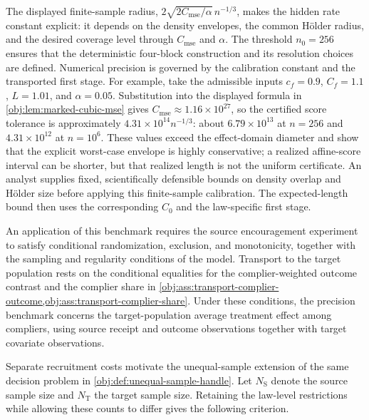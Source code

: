 \documentclass[11pt]{article}
\begin{document}
The displayed finite-sample radius, \(2\sqrt{2C_{\mathrm{mse}}/\alpha}\,n^{-1/3}\), makes the hidden rate constant explicit: it depends on the density envelopes, the common H\"older radius, and the desired coverage level through \(C_{\mathrm{mse}}\) and \(\alpha\). The threshold \(n_0=256\) ensures that the deterministic four-block construction and its resolution choices are defined. Numerical precision is governed by the calibration constant and the transported first stage. For example, take the admissible inputs \(c_f=0.9\), \(C_f=1.1\), \(L=1.01\), and \(\alpha=0.05\). Substitution into the displayed formula in \cref{obj:lem:marked-cubic-mse} gives \(C_{\mathrm{mse}}\approx1.16\times10^{27}\), so the certified score tolerance is approximately \(4.31\times10^{14}n^{-1/3}\): about \(6.79\times10^{13}\) at \(n=256\) and \(4.31\times10^{12}\) at \(n=10^6\). These values exceed the effect-domain diameter and show that the explicit worst-case envelope is highly conservative; a realized affine-score interval can be shorter, but that realized length is not the uniform certificate. An analyst supplies fixed, scientifically defensible bounds on density overlap and Hölder size before applying this finite-sample calibration. The expected-length bound then uses the corresponding \(C_0\) and the law-specific first stage.

An application of this benchmark requires the source encouragement experiment to satisfy conditional randomization, exclusion, and monotonicity, together with the sampling and regularity conditions of the model. Transport to the target population rests on the conditional equalities for the complier-weighted outcome contrast and the complier share in \cref{obj:ass:transport-complier-outcome,obj:ass:transport-complier-share}. Under these conditions, the precision benchmark concerns the target-population average treatment effect among compliers, using source receipt and outcome observations together with target covariate observations.

Separate recruitment costs motivate the unequal-sample extension of the same decision problem in \cref{obj:def:unequal-sample-handle}. Let \(N_{\mathrm S}\) denote the source sample size and \(N_{\mathrm T}\) the target sample size. Retaining the law-level restrictions while allowing these counts to differ gives the following criterion.
\end{document}
